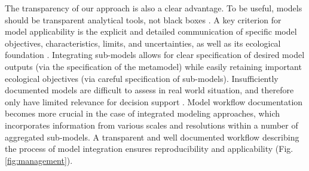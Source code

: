 The transparency of our approach is also a clear advantage. 
To be useful, models should be transparent analytical tools, not black boxes \citep{Addison2013}. 
A key criterion for model applicability is the explicit and detailed communication of specific model objectives, characteristics, limits, and uncertainties, as well as its ecological foundation \citep{Guisan2013}.
Integrating sub-models allows for clear specification of desired model outputs (via the specification of the metamodel) while easily retaining important ecological objectives (via careful specification of sub-models).
Insufficiently documented models are difficult to assess in real world situation, and therefore only have limited relevance for decision support \citep{Addison2013, Guisan2013}.
Model workflow documentation becomes more crucial in the case of integrated modeling approaches, which incorporates information from various scales and resolutions within a number of aggregated sub-models. 
A transparent and well documented workflow describing the process of model integration ensures reproducibility and applicability (Fig. \ref{fig:management}). 

